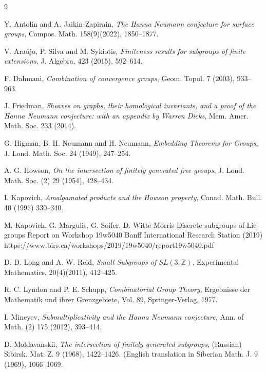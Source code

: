 \documentclass[]{amsart}
\newtheorem*{fixed point criterion}{\fixed point criterion}
\theoremstyle{definition}
\theoremstyle{remark}
\numberwithin{equation}{section}
\newcommand{\Z}{\mathbb Z}
\begin{document}
\begin{thebibliography}{9}

 Y. Antol\'{i}n and A. Jaikin-Zapirain, \emph{The Hanna Neumann conjecture for surface groups}, Compos. Math. 158(9)(2022), 1850--1877. 

 V. Araújo, P. Silva and M. Sykiotis, \textit{Finiteness results for subgroups of finite extensions}, J. Algebra, 423 (2015), 592--614.

  F. Dahmani, \textit{Combination of convergence groups}, Geom. Topol. 7 (2003), 933--963. 

 J. Friedman, \textit{Sheaves on graphs, their homological invariants, and a proof of the Hanna Neumann conjecture: with an appendix by Warren Dicks}, Mem. Amer. Math. Soc. 233 (2014).

 G. Higman, B. H. Neumann and H. Neumann, \textit{Embedding Theorems for Groups}, J. Lond. Math. Soc. 24 (1949), 247--254.

 A. G. Howson, \textit{On the intersection of ﬁnitely generated free groups}, J. Lond. Math. Soc. (2) 29 (1954), 428--434.

 I. Kapovich, \textit{Amalgamated products and the Howson property}, Canad. Math. Bull. 40 (1997) 330--340.

 M. Kapovich, G. Margulis, G. Soifer, D. Witte Morris
Discrete subgroups of Lie groups
Report on Workshop 19w5040
Banff International Research Station (2019)
https://www.birs.ca/workshops/2019/19w5040/report19w5040.pdf


 D. D. Long and A. W. Reid, \textit{Small Subgroups of $SL(3, \Z)$}, Experimental Mathematics, 20(4)(2011), 412--425.

R. C. Lyndon and P. E. Schupp,
\newblock \emph{Combinatorial Group Theory},
\newblock Ergebnisse der Mathematik und ihrer Grenzgebiete, Vol. 89,
Springer-Verlag, 1977.

 I. Mineyev, \textit{Submultiplicativity and the Hanna Neumann conjecture,} Ann. of Math. (2) 175 (2012), 393--414.

 D. Moldavanskii, \textit{The intersection of finitely generated subgroups}, (Russian) Sibirsk. Mat. Z. 9 (1968), 1422--1426. (English translation in Siberian Math. J. 9 (1969), 1066--1069. 


\end{thebibliography}
\end{document}
